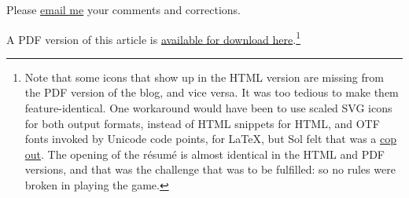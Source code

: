 \documentclass[
  british,
  a4paper,
  rgb,
  dvipsnames,
  svgnames,
  hyphens]{article}
\begin{document}
Please \href{mailto:feedback.swanlotus@gmail.com}{email me} your
comments and corrections.

\noindent A PDF version of this article is
\href{./using-font-awesome.pdf}{available for download here}.\footnote{Note
  that some icons that show up in the HTML version are missing from the
  PDF version of the blog, and vice versa. It was too tedious to make
  them feature-identical. One workaround would have been to use scaled
  SVG icons for both output formats, instead of HTML snippets for HTML,
  and OTF fonts invoked by Unicode code points, for LaTeX, but Sol felt
  that was a \href{https://www.thefreedictionary.com/cop+out}{cop out}.
  The opening of the résumé is almost identical in the HTML and PDF
  versions, and that was the challenge that was to be fulfilled: so no
  rules were broken in playing the game.  \normalfont}
\end{document}

